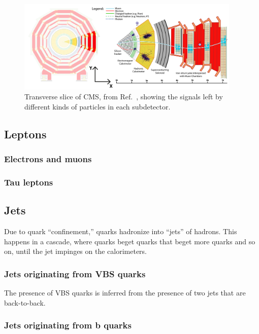 \begin{figure}[htb]
    \centering
    \includegraphics[width=0.95\textwidth]{fig/cms/particle_id_slice.pdf}
    \caption{
        Transverse slice of CMS, from Ref.~\cite{Davis:2205172}, showing the signals left by different kinds of particles in each subdetector.
    }
    \label{fig:cms_particle_id}
\end{figure}

\subsection{Leptons}
\subsubsection{Electrons and muons}
\subsubsection{Tau leptons}

\subsection{Jets}
Due to quark ``confinement,'' quarks hadronize into ``jets'' of hadrons. 
This happens in a cascade, where quarks beget quarks that beget more quarks and so on, until the jet impinges on the calorimeters. 

\subsubsection{Jets originating from VBS quarks}\label{sec:vbsjets}
The presence of VBS quarks is inferred from the presence of two jets that are back-to-back. %

\subsubsection{Jets originating from b quarks}

